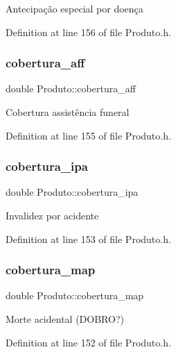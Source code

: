 Antecipação especial por doença 

Definition at line 156 of file Produto.\+h.

\hypertarget{class_produto_afaebf7dcd9c82cf945aa6cbbe8a5d571}{}\label{class_produto_afaebf7dcd9c82cf945aa6cbbe8a5d571} 
\subsubsection{\texorpdfstring{cobertura\+\_\+aff}{cobertura\_aff}}
{\footnotesize\ttfamily double Produto\+::cobertura\+\_\+aff\hspace{0.3cm}{\ttfamily [private]}}

Cobertura assistência funeral 

Definition at line 155 of file Produto.\+h.

\hypertarget{class_produto_afb515e4bf63df7562d4c78e31ee79426}{}\label{class_produto_afb515e4bf63df7562d4c78e31ee79426} 
\subsubsection{\texorpdfstring{cobertura\+\_\+ipa}{cobertura\_ipa}}
{\footnotesize\ttfamily double Produto\+::cobertura\+\_\+ipa\hspace{0.3cm}{\ttfamily [private]}}

Invalidez por acidente 

Definition at line 153 of file Produto.\+h.

\hypertarget{class_produto_ad9abc041cef9daa2abda343285df5a2e}{}\label{class_produto_ad9abc041cef9daa2abda343285df5a2e} 
\subsubsection{\texorpdfstring{cobertura\+\_\+map}{cobertura\_map}}
{\footnotesize\ttfamily double Produto\+::cobertura\+\_\+map\hspace{0.3cm}{\ttfamily [private]}}

Morte acidental (D\+O\+B\+RO?) 

Definition at line 152 of file Produto.\+h.

\hypertarget{class_produto_a37d0ef7fbcdce4de9c27911f85f7c0f1}{}\label{class_produto_a37d0ef7fbcdce4de9c27911f85f7c0f1} 
